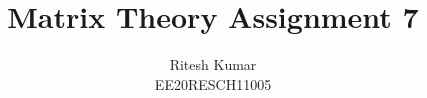 \documentclass[journal,12pt,twocolumn]{IEEEtran}
\DeclareMathOperator*{\Res}{Res}
\begin{document}
	
	
	\newtheorem{theorem}{Theorem}[section]
	\newtheorem{problem}{Problem}
	\newtheorem{proposition}{Proposition}[section]
	\newtheorem{lemma}{Lemma}[section]
	\newtheorem{corollary}[theorem]{Corollary}
	\newtheorem{example}{Example}[section]
	\newtheorem{definition}[problem]{Definition}
	
	\newcommand{\BEQA}{\begin{eqnarray}}
	\newcommand{\EEQA}{\end{eqnarray}}
	\newcommand{\define}{\stackrel{\triangle}{=}}
	
	\providecommand{\mbf}{\mathbf}
	\providecommand{\pr}[1]{\ensuremath{\Pr\left(#1\right)}}
	\providecommand{\qfunc}[1]{\ensuremath{Q\left(#1\right)}}
	\providecommand{\sbrak}[1]{\ensuremath{{}\left[#1\right]}}
	\providecommand{\lsbrak}[1]{\ensuremath{{}\left[#1\right.}}
	\providecommand{\rsbrak}[1]{\ensuremath{{}\left.#1\right]}}
	\providecommand{\brak}[1]{\ensuremath{\left(#1\right)}}
	\providecommand{\lbrak}[1]{\ensuremath{\left(#1\right.}}
	\providecommand{\rbrak}[1]{\ensuremath{\left.#1\right)}}
	\providecommand{\cbrak}[1]{\ensuremath{\left\{#1\right\}}}
	\providecommand{\lcbrak}[1]{\ensuremath{\left\{#1\right.}}
	\providecommand{\rcbrak}[1]{\ensuremath{\left.#1\right\}}}
	\theoremstyle{remark}
	\newtheorem{rem}{Remark}
	\newcommand{\sgn}{\mathop{\mathrm{sgn}}}
	\providecommand{\abs}[1]{\left\vert#1\right\vert}
	\providecommand{\res}[1]{\Res\displaylimits_{#1}} 
	\providecommand{\norm}[1]{\left\lVert#1\right\rVert}
	\providecommand{\mtx}[1]{\mathbf{#1}}
	\providecommand{\mean}[1]{E\left[ #1 \right]}
	\providecommand{\fourier}{\overset{\mathcal{F}}{ \rightleftharpoons}}
	\providecommand{\system}{\overset{\mathcal{H}}{ \longleftrightarrow}}
	\newcommand{\solution}{\noindent \textbf{Solution: }}
	\newcommand{\cosec}{\,\text{cosec}\,}
	\providecommand{\dec}[2]{\ensuremath{\overset{#1}{\underset{#2}{\gtrless}}}}
	\newcommand{\myvec}[1]{\ensuremath{\begin{pmatrix}#1\end{pmatrix}}}
	\newcommand{\mydet}[1]{\ensuremath{\begin{vmatrix}#1\end{vmatrix}}}
	\makeatletter
	\makeatother
	\let\StandardTheFigure\thefigure
	\let\vec\mathbf
	\renewcommand{\thefigure}{\theproblem}
	\def\putbox#1#2#3{\makebox[0in][l]{\makebox[#1][l]{}\raisebox{\baselineskip}[0in][0in]{\raisebox{#2}[0in][0in]{#3}}}}
	\def\rightbox#1{\makebox[0in][r]{#1}}
	\def\centbox#1{\makebox[0in]{#1}}
	\def\topbox#1{\raisebox{-\baselineskip}[0in][0in]{#1}}
	\def\midbox#1{\raisebox{-0.5\baselineskip}[0in][0in]{#1}}
	\vspace{3cm}
	\title{Matrix Theory Assignment 7}
	\author{Ritesh Kumar \\ EE20RESCH11005}
	
\end{document}
